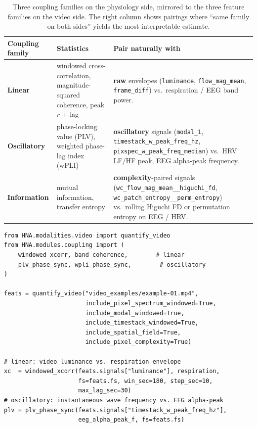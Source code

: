 \documentclass[11pt,a4paper]{article}
\newcommand{\code}[1]{\texttt{\small #1}}
\newcommand{\famraw}[1]{\textcolor{famraw}{\textbf{#1}}}
\newcommand{\famosc}[1]{\textcolor{famosc}{\textbf{#1}}}
\newcommand{\famcpl}[1]{\textcolor{famcpl}{\textbf{#1}}}
\begin{document}
\begin{table}[ht]
\centering
\small
\renewcommand{\arraystretch}{1.18}
\setlength{\tabcolsep}{8pt}
\begin{tabularx}{\linewidth}{l X X}
\toprule
\textbf{Coupling family} & \textbf{Statistics} &
   \textbf{Pair naturally with} \\
\midrule
\textbf{Linear}  & windowed cross-correlation,
                   magnitude-squared coherence,
                   peak $r$ + lag &
                   \famraw{raw} envelopes (\code{luminance},
                   \code{flow\_mag\_mean}, \code{frame\_diff})
                   vs.\ respiration / EEG band power. \\
\textbf{Oscillatory} & phase-locking value (PLV),
                       weighted phase-lag index (wPLI) &
                       \famosc{oscillatory} signals
                       (\code{modal\_1},
                        \code{timestack\_w\_peak\_freq\_hz},
                        \code{pixspec\_w\_peak\_freq\_median})
                       vs.\ HRV LF/HF peak, EEG alpha-peak
                       frequency. \\
\textbf{Information} & mutual information,
                       transfer entropy &
                       \famcpl{complexity}-paired signals
                       (\code{wc\_flow\_mag\_mean\_\_higuchi\_fd},
                        \code{wc\_patch\_entropy\_\_perm\_entropy})
                       vs.\ rolling Higuchi FD or permutation
                       entropy on EEG / HRV. \\
\bottomrule
\end{tabularx}
\caption{Three coupling families on the physiology side, mirrored to
the three feature families on the video side. The right column shows
pairings where ``same family on both sides'' yields the most
interpretable estimate.}
\label{tab:coupling}
\end{table}

\begin{lstlisting}
from HNA.modalities.video import quantify_video
from HNA.modules.coupling import (
    windowed_xcorr, band_coherence,        # linear
    plv_phase_sync, wpli_phase_sync,        # oscillatory
)

feats = quantify_video("video_examples/example-01.mp4",
                       include_pixel_spectrum_windowed=True,
                       include_modal_windowed=True,
                       include_timestack_windowed=True,
                       include_spatial_field=True,
                       include_pixel_complexity=True)

# linear: video luminance vs. respiration envelope
xc  = windowed_xcorr(feats.signals["luminance"], respiration,
                     fs=feats.fs, win_sec=180, step_sec=10,
                     max_lag_sec=30)
# oscillatory: instantaneous wave frequency vs. EEG alpha-peak
plv = plv_phase_sync(feats.signals["timestack_w_peak_freq_hz"],
                     eeg_alpha_peak_f, fs=feats.fs)
\end{lstlisting}
\end{document}
